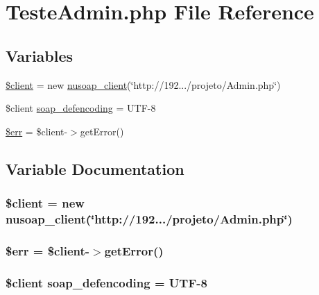 \hypertarget{_teste_admin_8php}{}\section{Teste\+Admin.\+php File Reference}
\label{_teste_admin_8php}
\subsection*{Variables}
\begin{DoxyCompactItemize}
\item 
\hyperlink{_teste_admin_8php_ad1405dc1ba2e288764378e79bff7a87d}{\$client} = new \hyperlink{classnusoap__client}{nusoap\+\_\+client}(\char`\"{}http\+://192.../projeto/Admin.\+php\char`\"{})
\item 
\$client \hyperlink{_teste_admin_8php_a944cce1b9c1aa5e93c77ace20ce99989}{soap\+\_\+defencoding} = \textquotesingle{}U\+T\+F-\/8\textquotesingle{}
\item 
\hyperlink{_teste_admin_8php_acfc00bd4a41804552c630950bf61a51f}{\$err} = \$client-\/$>$get\+Error()
\end{DoxyCompactItemize}


\subsection{Variable Documentation}
\hypertarget{_teste_admin_8php_ad1405dc1ba2e288764378e79bff7a87d}{}
\subsubsection[{\$client}]{\setlength{\rightskip}{0pt plus 5cm}\$client = new {\bf nusoap\+\_\+client}(\char`\"{}http\+://192.../projeto/Admin.\+php\char`\"{})}\label{_teste_admin_8php_ad1405dc1ba2e288764378e79bff7a87d}
\hypertarget{_teste_admin_8php_acfc00bd4a41804552c630950bf61a51f}{}
\subsubsection[{\$err}]{\setlength{\rightskip}{0pt plus 5cm}\$err = \$client-\/$>$get\+Error()}\label{_teste_admin_8php_acfc00bd4a41804552c630950bf61a51f}
\hypertarget{_teste_admin_8php_a944cce1b9c1aa5e93c77ace20ce99989}{}
\subsubsection[{soap\+\_\+defencoding}]{\setlength{\rightskip}{0pt plus 5cm}\$client soap\+\_\+defencoding = \textquotesingle{}U\+T\+F-\/8\textquotesingle{}}\label{_teste_admin_8php_a944cce1b9c1aa5e93c77ace20ce99989}
